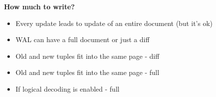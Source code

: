 \documentclass[usenames,dvipsnames, 18pt, compress, aspectratio=169]{beamer}
\begin{document}
\begin{frame}
    \frametitle{}
    \begin{center}
    \textbf{How much to write?}

        \begin{itemize}[label={\MVRightarrow}]
            \item Every update leads to update of an entire document (but it's ok)
            \item WAL can have a full document or just a diff
            \item Old and new tuples fit into the same page - diff
            \item Old and new tuples fit into the same page - full
            \item If logical decoding is enabled - full
        \end{itemize}

    \end{center}
\end{frame}
\end{document}
